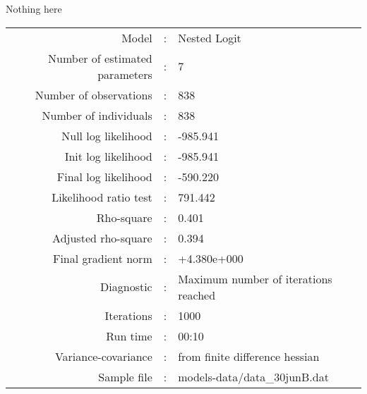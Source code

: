 Nothing here\\


\begin{flushleft}
\begin{tabular}{rcl}
\hline
Model &:& Nested Logit\\
Number of estimated parameters&:&7\\
Number of  observations &:& 838\\
Number of individuals&:&838\\
Null log likelihood&:&-985.941\\
Init log likelihood&:&-985.941\\
Final log likelihood&:&-590.220\\
Likelihood ratio test &:&791.442\\
Rho-square&:&0.401\\
Adjusted rho-square&:&0.394\\
Final gradient norm&:&+4.380e+000\\
Diagnostic&:&Maximum number of iterations reached\\
Iterations&:&1000\\
Run time&:&00:10\\
Variance-covariance&:&from finite difference hessian\\
Sample file&:&models-data/data_30junB.dat\\
\end{tabular}
\end{flushleft}
